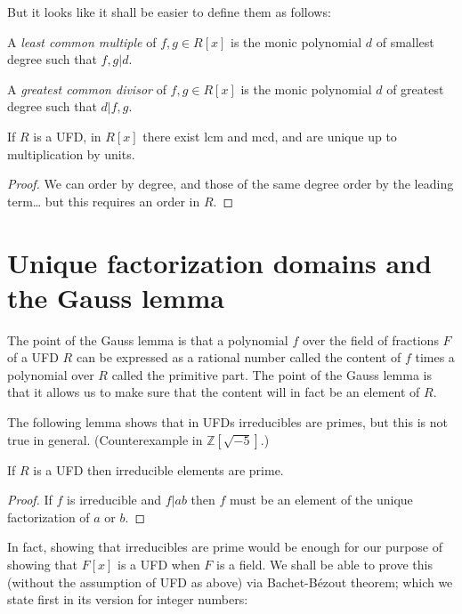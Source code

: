 But it looks like it shall be easier to define them
as follows:

\begin{definition}
\label{definition-lcm-and-gdc-polynomial}
A {\it least common multiple} of $f,g \in R[x]$ is the monic polynomial $d$ of
smallest degree such that $f,g|d$.

A {\it greatest common divisor} of $f,g\in R[x]$ is the monic polynomial $d$ of
greatest degree such that $d|f,g$.
\end{definition}

\begin{lemma}
\label{lemma-existence-of-lcm-and-gcd}
If $R$ is a UFD, in $R[x]$ there exist lcm and mcd, and are unique up to 
multiplication by units.
\end{lemma}

\begin{proof}
We can order by degree, and those of the same degree order by the leading
term… but this requires an order in $R$.
\end{proof}

\section{Unique factorization domains and the Gauss lemma}
\label{section-UFD}

The point of the Gauss lemma is that a polynomial $f$ over the field of fractions
$F$ of a UFD $R$ can be expressed as a rational number called the content of $f$
times a polynomial over $R$ called the primitive part. The point of the Gauss
lemma is that it allows us to make sure that the content will in fact be an
element of $R$.

\medskip\noindent
The following lemma shows that in UFDs irreducibles are primes, but this is not
true in general. (Counterexample in $\mathbb{Z}[\sqrt{-5}]$.)

\begin{lemma}
\label{lemma-irreducible-is-prime}
If $R$ is a UFD then irreducible elements are prime.
\end{lemma}

\begin{proof}
If $f$ is irreducible and $f|ab$ then $f$ must be an element of the unique
factorization of $a$ or $b$.
\end{proof}

In fact, showing that irreducibles are prime would be enough for our purpose of
showing that $F[x]$ is a UFD when $F$ is a field. We shall be able to prove this
(without the assumption of UFD as above) via Bachet-Bézout theorem; which we
state first in its version for integer numbers:

